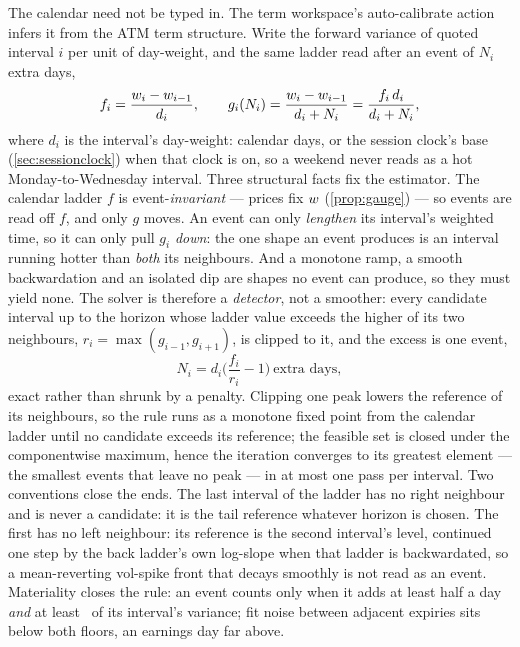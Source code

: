 \documentclass[11pt]{article}
\begin{document}
The calendar need not be typed in.  The term workspace's auto-calibrate
action infers it from the ATM term structure.  Write the forward
variance of quoted interval $i$ per unit of day-weight, and the same
ladder read after an event of $N_i$ extra days,
\begin{equation}
f_i=\frac{w_i-w_{i-1}}{d_i},\qquad
g_i(N_i)=\frac{w_i-w_{i-1}}{d_i+N_i}=\frac{f_i\,d_i}{d_i+N_i},
\label{eq:autocal}
\end{equation}
where $d_i$ is the interval's day-weight: calendar days, or the session
clock's base (\cref{sec:sessionclock}) when that clock is on, so a
weekend never reads as a hot Monday-to-Wednesday interval.  Three
structural facts fix the estimator.  The calendar ladder $f$ is
event-\emph{invariant} --- prices fix $w$ (\cref{prop:gauge}) --- so
events are read off $f$, and only $g$ moves.  An event can only
\emph{lengthen} its interval's weighted time, so it can only pull $g_i$
\emph{down}: the one shape an event produces is an interval running
hotter than \emph{both} its neighbours.  And a monotone ramp, a smooth
backwardation and an isolated dip are shapes no event can produce, so
they must yield none.  The solver is therefore a \emph{detector}, not a
smoother: every candidate interval up to the horizon whose ladder value
exceeds the higher of its two neighbours, $r_i=\max(g_{i-1},g_{i+1})$,
is clipped to it, and the excess is one event,
\begin{equation}
N_i=d_i\Big(\frac{f_i}{r_i}-1\Big)\ \text{extra days},
\label{eq:autocal-size}
\end{equation}
exact rather than shrunk by a penalty.  Clipping one peak lowers the
reference of its neighbours, so the rule runs as a monotone fixed point
from the calendar ladder until no candidate exceeds its reference; the
feasible set is closed under the componentwise maximum, hence the
iteration converges to its greatest element --- the smallest events that
leave no peak --- in at most one pass per interval.  Two conventions
close the ends.  The last interval of the ladder has no right neighbour
and is never a candidate: it is the tail reference whatever horizon is
chosen.  The first has no left neighbour: its reference is the second
interval's level, continued one step by the back ladder's own log-slope
when that ladder is backwardated, so a mean-reverting vol-spike front
that decays smoothly is not read as an event.  Materiality closes the
rule: an event counts only when it adds at least half a day \emph{and}
at least \emcminrel\ of its interval's variance; fit noise between
adjacent expiries sits below both floors, an earnings day far above.
\end{document}
